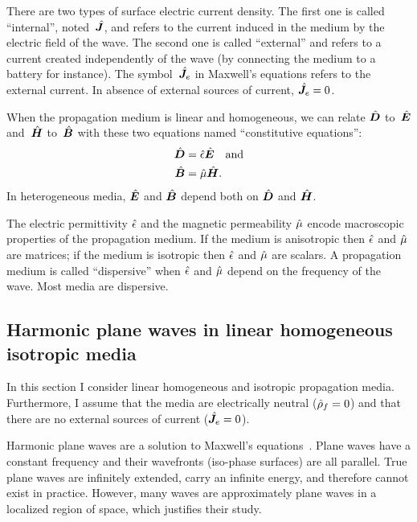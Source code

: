 There are two types of surface electric current density.
The first one is called ``internal'', noted~$\hat{\bm{J}}$, and refers to the current induced in the medium by the electric field of the wave.
The second one is called ``external'' and refers to a current created independently of the wave (by connecting the medium to a battery for instance).
The symbol~$\hat{\bm{J}}_e$ in Maxwell's equations refers to the external current.
In absence of external sources of current, $\hat{\bm{J}}_e=0$.

When the propagation medium is linear and homogeneous,
we can relate $\hat{\bm{D}}$ to~$\hat{\bm{E}}$
and~$\hat{\bm{H}}$ to~$\hat{\bm{B}}$
with these two equations named ``constitutive equations'':
\begin{subequations}
    \label{eq:complex_constitutive}
    \begin{align}
        \hat{\bm{D}} &= \hat{\epsilon} \hat{\bm{E}} \text{\quad and}
        \label{eq:complex_constitutive_electric}
        \\
        \hat{\bm{B}} &= \hat{\mu}      \hat{\bm{H}}
        \label{eq:complex_constitutive_magnetic}
        \text{.}
    \end{align}
\end{subequations}
In heterogeneous media, $\hat{\bm{E}}$ and $\hat{\bm{B}}$ depend both on $\hat{\bm{D}}$ and $\hat{\bm{H}}$.

The electric permittivity $\hat{\epsilon}$ and
the magnetic permeability $\hat{\mu}$
encode macroscopic properties of the propagation medium.
If the medium is anisotropic then $\hat{\epsilon}$ and $\hat{\mu}$ are matrices;
if the medium is isotropic   then $\hat{\epsilon}$ and $\hat{\mu}$ are scalars.
A propagation medium is called ``dispersive'' when $\hat{\epsilon}$ and $\hat{\mu}$ depend on the frequency of the wave.
Most media are dispersive.




\subsection{Harmonic plane waves in linear homogeneous isotropic media}

In this section I consider linear homogeneous and isotropic propagation media.
Furthermore, I assume that the media are electrically neutral ($\hat{\rho}_f = 0$) and that there are no external sources of current ($\hat{\bm{J}}_e=0$).

Harmonic plane waves are a solution to Maxwell's equations~\parencite{stratton1941electromagnetic}.
Plane waves have a constant frequency and their wavefronts (iso-phase surfaces) are all parallel.
True plane waves are infinitely extended, carry an infinite energy, and therefore cannot exist in practice.
However, many waves are approximately plane waves in a localized region of space,
which justifies their study.


